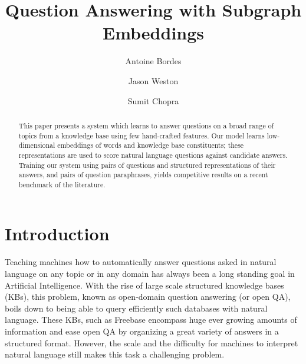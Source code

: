 \documentclass[runningheads,a4paper]{llncs}
\newcommand{\fb}{{\sc Freebase}\xspace}
\begin{document}
\mainmatter  

\title{Question Answering with Subgraph Embeddings }




\author{Antoine Bordes
\and Jason Weston \and Sumit Chopra}





\maketitle




\begin{abstract}
This paper presents a system which learns to answer questions on a
broad range of topics from a knowledge base using few hand-crafted features.
Our model learns low-dimensional embeddings of words and
knowledge base constituents; these representations
are used to score natural language questions against candidate answers.
Training our system using pairs of questions and structured
representations of their answers, and pairs of
question paraphrases, yields competitive results on a
recent benchmark of the literature.
\end{abstract}



\section{Introduction}


Teaching machines how to automatically answer questions asked in natural
language on any topic or in any domain has always been a long standing
goal in Artificial Intelligence.
With the rise of large scale structured knowledge bases (KBs), this
problem, known as open-domain question answering (or open QA), 
boils down to being able to
query efficiently such databases with natural language.
These KBs, such as \fb \cite{bollacker2008freebase} 
encompass huge ever growing amounts of information
and
ease open QA by organizing a great variety of answers in a structured
format.
However, the scale and the difficulty for machines to
interpret natural language still makes this task a challenging problem.
\end{document}
